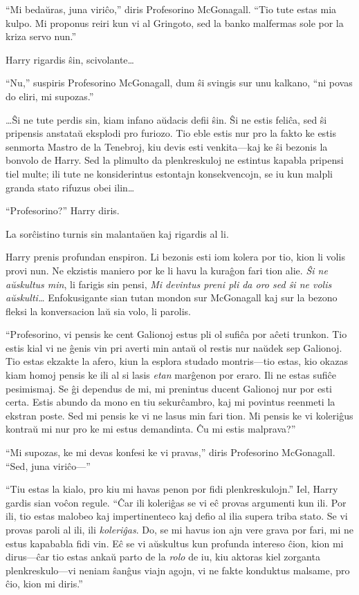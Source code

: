 ``Mi bedaŭras, juna viriĉo,'' diris Profesorino McGonagall. ``Tio tute
estas mia kulpo. Mi proponus reiri kun vi al Gringoto, sed la banko
malfermas sole por la kriza servo nun.''

Harry rigardis ŝin, scivolante\ldots

``Nu,'' suspiris Profesorino McGonagall, dum ŝi svingis sur unu
kalkano, ``ni povas do eliri, mi supozas.''

\ldots Ŝi ne tute perdis sin, kiam infano aŭdacis defii ŝin.  Ŝi ne
estis feliĉa, sed ŝi pripensis anstataŭ eksplodi pro furiozo. Tio eble
estis nur pro la fakto ke estis senmorta Mastro de la Tenebroj, kiu
devis esti venkita—kaj ke ŝi bezonis la bonvolo de Harry. Sed la
plimulto da plenkreskuloj ne estintus kapabla pripensi tiel multe; ili
tute ne konsiderintus estontajn konsekvencojn, se iu kun malpli granda
stato rifuzus obei ilin\ldots

``Profesorino?'' Harry diris.

La sorĉistino turnis sin malantaŭen kaj rigardis al li.

Harry prenis profundan enspiron. Li bezonis esti iom kolera por tio,
kion li volis provi nun. Ne ekzistis maniero por ke li havu la kuraĝon
fari tion alie. \emph{Ŝi ne aŭskultus min}, li farigis sin pensi,
\emph{Mi devintus preni pli da oro sed ŝi ne volis aŭskulti\ldots}
Enfokusigante sian tutan mondon sur McGonagall kaj sur la bezono
fleksi la konversacion laŭ sia volo, li parolis.

``Profesorino, vi pensis ke cent Galionoj estus pli ol sufiĉa por
aĉeti trunkon. Tio estis kial vi ne ĝenis vin pri averti min antaŭ ol
restis nur naŭdek sep Galionoj. Tio estas ekzakte la afero, kiun la
esplora studado montris—tio estas, kio okazas kiam homoj pensis ke ili
al si lasis \emph{etan} marĝenon por eraro. Ili ne estas sufiĉe
pesimismaj. Se ĝi dependus de mi, mi prenintus ducent Galionoj nur por
esti certa. Estis abundo da mono en tiu sekurĉambro, kaj mi povintus
reenmeti la ekstran poste. Sed mi pensis ke vi ne lasus min fari
tion. Mi pensis ke vi koleriĝus kontraŭ mi nur pro ke mi estus
demandinta. Ĉu mi estis malprava?''

``Mi supozas, ke mi devas konfesi ke vi pravas,'' diris
Profesorino McGonagall. ``Sed, juna viriĉo—''

``Tiu estas la kialo, pro kiu mi havas penon por fidi
plenkreskulojn.'' Iel, Harry gardis sian voĉon regule. ``Ĉar ili
koleriĝas se vi eĉ provas argumenti kun ili. Por ili, tio estas
malobeo kaj impertinenteco kaj defio al ilia supera triba stato. Se vi
provas paroli al ili, ili \emph{koleriĝas}.  Do, se mi havus ion ajn
vere grava por fari, mi ne estus kapababla fidi vin. Eĉ se vi
aŭskultus kun profunda intereso ĉion, kion mi dirus—ĉar tio estas
ankaŭ parto de la \emph{rolo} de iu, kiu aktoras kiel zorganta
plenkreskulo—vi neniam ŝanĝus viajn agojn, vi ne fakte konduktus
malsame, pro ĉio, kion mi diris.''

